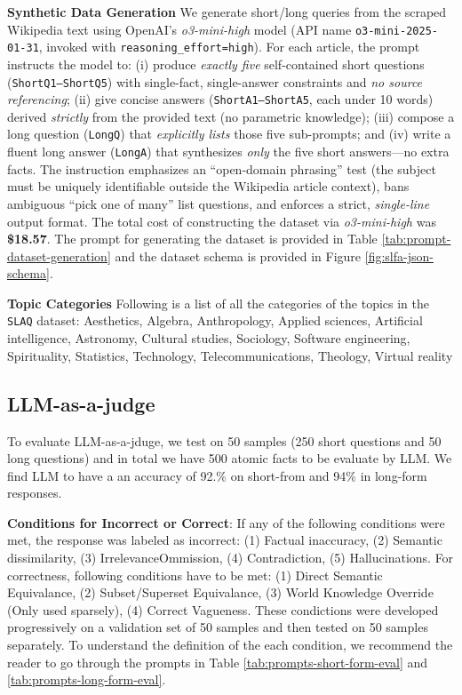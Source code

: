 \documentclass[11pt]{article}
\newcommand{\rparagraph}[1]{\vspace{1.2mm}\noindent\textbf{#1}}
\newcommand{\acrnm}{\texttt{SLAQ}\xspace}
\begin{document}
\rparagraph{Synthetic Data Generation} We generate short/long queries from the scraped Wikipedia text using OpenAI's \emph{o3-mini-high} model (API name \texttt{o3-mini-2025-01-31}, invoked with \texttt{reasoning\_effort=high}). For each article, the prompt instructs the model to: (i) produce \emph{exactly five} self-contained short questions (\texttt{ShortQ1--ShortQ5}) with single-fact, single-answer constraints and \emph{no source referencing}; (ii) give concise answers (\texttt{ShortA1--ShortA5}, each under 10 words) derived \emph{strictly} from the provided text (no parametric knowledge); (iii) compose a long question (\texttt{LongQ}) that \emph{explicitly lists} those five sub-prompts; and (iv) write a fluent long answer (\texttt{LongA}) that synthesizes \emph{only} the five short answers---no extra facts. The instruction emphasizes an ``open-domain phrasing'' test (the subject must be uniquely identifiable outside the Wikipedia article context), bans ambiguous ``pick one of many'' list questions, and enforces a strict, \emph{single-line} output format. The total cost of constructing the dataset via \emph{o3-mini-high} was \textbf{\$18.57}. The prompt for generating the dataset is provided in Table \ref{tab:prompt-dataset-generation} and the dataset schema is provided in Figure \ref{fig:slfa-json-schema}. 

\rparagraph{Topic Categories} Following is a list of all the categories of the topics in the \acrnm dataset: Aesthetics, Algebra, Anthropology, Applied sciences, Artificial intelligence, Astronomy, Cultural studies, Sociology, Software engineering, Spirituality, Statistics, Technology, Telecommunications, Theology, Virtual reality

\subsection{LLM-as-a-judge}
To evaluate LLM-as-a-jduge, we test on 50 samples (250 short questions and 50 long questions) and in total we have 500 atomic facts to be evaluate by LLM. We find LLM to have a an accuracy of 92.\% on short-from and 94\% in long-form responses. 

\rparagraph{Conditions for Incorrect or Correct}:
If any of the following conditions were met, the response was labeled as incorrect: (1) Factual inaccuracy, (2) Semantic dissimilarity, (3) Irrelevance\/Ommission, (4) Contradiction, (5) Hallucinations. For correctness, following conditions have to be met: (1) Direct Semantic Equivalance, (2) Subset/Superset Equivalance, (3) World Knowledge Override (Only used sparsely), (4) Correct Vagueness. These condictions were developed progressively on a validation set of 50 samples and then tested on 50 samples separately. To understand the definition of the each condition, we recommend the reader to go through the prompts in Table \ref{tab:prompts-short-form-eval} and \ref{tab:prompts-long-form-eval}. 
\end{document}

